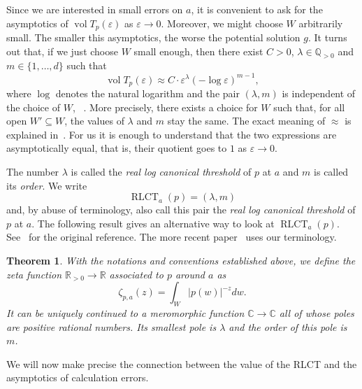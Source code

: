 \documentclass[11pt]{amsart}
\DeclareMathOperator{\rlct}{RLCT}
\numberwithin{equation}{section}
\theoremstyle{plain}
\newtheorem{theorem}{Theorem}[section]
\theoremstyle{definition}
\newcommand{\C}{\mathbb{C}}
\newcommand{\R}{\mathbb{R}}
\newcommand{\Q}{\mathbb{Q}}
\begin{document}
Since we are interested in small errors on $a$, it is convenient to ask for the asymptotics of $\operatorname{vol} T_p(\varepsilon)$ as $\varepsilon \to 0$. Moreover, we might choose $W$ arbitrarily small. The smaller this asymptotics, the worse the potential solution $g$. It turns out that, if we just choose $W$ small enough, then there exist $C > 0$, $\lambda \in \Q_{> 0}$ and $m \in \{1,\ldots,d\}$ such that 
\[
\operatorname{vol} T_p(\varepsilon) \approx C \cdot \varepsilon^\lambda (- \log \varepsilon)^{m-1},
\]
where $\log$ denotes the natural logarithm and the pair $(\lambda,m)$ is independent of the choice of $W$, ~\cite[Lemma 7.2]{Lin:tubes}. More precisely, there exists a choice for $W$ such that, for all open $W' \subseteq W$, the values of $\lambda$ and $m$ stay the same. The exact meaning of $\approx$ is explained in~\cite{Lin:tubes}. For us it is enough to understand that the two expressions are asymptotically equal, that is, their quotient goes to $1$ as $\varepsilon \to 0$.

The number $\lambda$ is called the \emph{real log canonical threshold} of $p$ at $a$ and $m$ is called its \emph{order}.
We write 
\[
\rlct_a(p) = (\lambda,m)
\]
and, by abuse of terminology, also call this pair the \emph{real log canonical threshold} of $p$ at $a$. The following result gives an alternative way to look at $\rlct_a(p)$. See~\cite{Atiyah:1970} for the original reference. The more recent paper~\cite[Corollary 3.10]{lin:phd} uses our terminology.

\begin{theorem}
    With the notations and conventions established above, we define the \emph{zeta function} $\R_{> 0} \to \R$ associated to $p$ around $a$ as
    \[
    \zeta_{p,a}(z) = \int_W \vert p(w)\vert^{-z}dw.
    \]
    It can be uniquely continued to a meromorphic function $\C \to \C$ all of whose poles are positive rational numbers. Its smallest pole is $\lambda$ and the order of this pole is $m$.
\end{theorem}

We will now make precise the connection between the value of the RLCT and the asymptotics of calculation errors.
\end{document}
